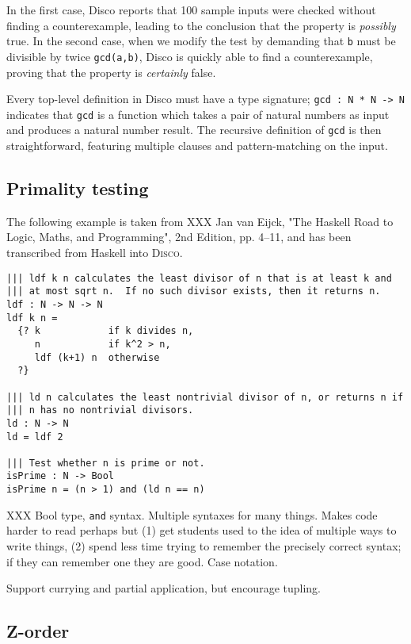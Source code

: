 \documentclass[submission,copyright,creativecommons]{eptcs}
\newcommand{\disco}{\textsc{Disco}\xspace}
\begin{document}
In the first case, Disco reports that 100 sample inputs were checked
without finding a counterexample, leading to the conclusion that the
property is \emph{possibly} true.  In the second case, when we modify
the test by demanding that \verb|b| must be divisible by twice
\verb|gcd(a,b)|, Disco is quickly able to find a counterexample,
proving that the property is \emph{certainly} false.

Every top-level definition in Disco must have a type signature;
\verb|gcd : N * N -> N| indicates that \verb|gcd| is a function which
takes a pair of natural numbers as input and produces a natural number
result.  The recursive definition of \verb|gcd| is then
straightforward, featuring multiple clauses and pattern-matching on
the input.

\subsection{Primality testing}
\label{sec:primetest}

The following example is taken from XXX Jan van Eijck, "The Haskell Road
to Logic, Maths, and Programming", 2nd Edition, pp. 4--11, and has
been transcribed from Haskell into \disco.

\begin{verbatim}
||| ldf k n calculates the least divisor of n that is at least k and
||| at most sqrt n.  If no such divisor exists, then it returns n.
ldf : N -> N -> N
ldf k n =
  {? k            if k divides n,
     n            if k^2 > n,
     ldf (k+1) n  otherwise
  ?}

||| ld n calculates the least nontrivial divisor of n, or returns n if
||| n has no nontrivial divisors.
ld : N -> N
ld = ldf 2

||| Test whether n is prime or not.
isPrime : N -> Bool
isPrime n = (n > 1) and (ld n == n)
\end{verbatim}

XXX Bool type, \verb|and| syntax.  Multiple syntaxes for many things.
Makes code harder to read perhaps but (1) get students used to the
idea of multiple ways to write things, (2) spend less time trying to
remember the precisely correct syntax; if they can remember one they
are good.  Case notation.

Support currying and partial application, but encourage tupling.

\subsection{Z-order}
\label{sec:zorder}
\end{document}
